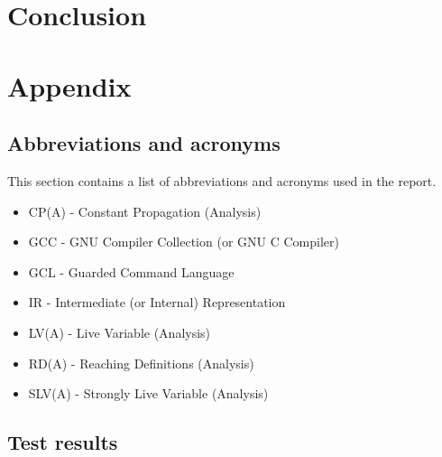 \documentclass{report}
\begin{document}


\chapter{Conclusion}



\chapter{Appendix}

\section{Abbreviations and acronyms}

This section contains a list of abbreviations and acronyms used in
the report.

\begin{itemize}
\item CP(A) - Constant Propagation (Analysis)
\item GCC - GNU Compiler Collection (or GNU C Compiler)
\item GCL - Guarded Command Language
\item IR - Intermediate (or Internal) Representation
\item LV(A) - Live Variable (Analysis)
\item RD(A) - Reaching Definitions (Analysis)
\item SLV(A) - Strongly Live Variable (Analysis)
\end{itemize}

\section{Test results}
\end{document}

